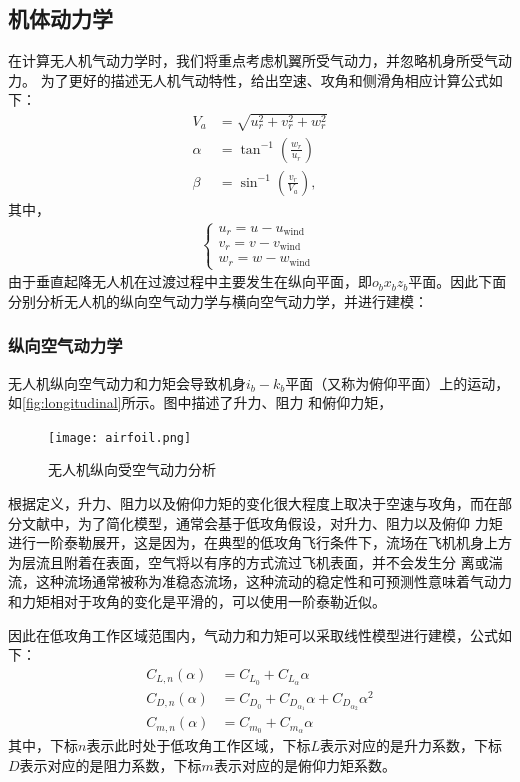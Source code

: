 \subsection{机体动力学}
在计算无人机气动力学时，我们将重点考虑机翼所受气动力，并忽略机身所受气动力\cite{zhang2013new}。
为了更好的描述无人机气动特性，给出空速、攻角和侧滑角相应计算公式如下：
\begin{align}
    V_{a} & =\sqrt{u_{r}^{2}+v_{r}^{2}+w_{r}^{2}} \\
    \alpha & =\tan ^{-1}\left(\frac{w_{r}}{u_{r}}\right) \\
    \beta & =\sin ^{-1}\left(\frac{v_{r}}{V_{a}}\right),
\end{align}
其中，
\begin{align*}
    \left\{\begin{matrix}
        u_{r} = u-u_{\text {wind }}\\
        v_{r} = v-v_{\text {wind }}\\
        w_{r} = w-w_{\text {wind }}
        \end{matrix}\right.
\end{align*}
由于垂直起降无人机在过渡过程中主要发生在纵向平面，即$o_{b}x_{b}z_{b}$平面。因此下面分别分析无人机的纵向空气动力学与横向空气动力学，并进行建模：
\subsubsection{纵向空气动力学}
无人机纵向空气动力和力矩会导致机身$i_{b}-k_{b}$平面（又称为俯仰平面）上的运动，如\autoref{fig:longitudinal}所示。图中描述了升力、阻力
和俯仰力矩，
\begin{figure}[htbp]
    \centering
    \texttt{[image: airfoil.png]}
    \caption{\label{fig:longitudinal}无人机纵向受空气动力分析}
\end{figure}
根据定义，升力、阻力以及俯仰力矩的变化很大程度上取决于空速与攻角，而在部分文献中，为了简化模型，通常会基于低攻角假设，对升力、阻力以及俯仰
力矩进行一阶泰勒展开，这是因为，在典型的低攻角飞行条件下，流场在飞机机身上方为层流且附着在表面，空气将以有序的方式流过飞机表面，并不会发生分
离或湍流，这种流场通常被称为准稳态流场，这种流动的稳定性和可预测性意味着气动力和力矩相对于攻角的变化是平滑的，可以使用一阶泰勒近似。

因此在低攻角工作区域范围内，气动力和力矩可以采取线性模型进行建模\cite{kikumoto2022back}，公式如下：
\begin{align}
    C_{L,n}(\alpha) &= C_{L_{0}}+C_{L_{\alpha}} \alpha \\
    C_{D,n}(\alpha) &=C_{D_{0}}+C_{D_{\alpha_{1}}} \alpha+C_{D_{\alpha_{2}}} \alpha^{2} \\
    C_{m,n}(\alpha) &= C_{m_{0}}+C_{m_{\alpha}} \alpha
\end{align}
其中，下标$n$表示此时处于低攻角工作区域，下标$L$表示对应的是升力系数，下标$D$表示对应的是阻力系数，下标$m$表示对应的是俯仰力矩系数。

